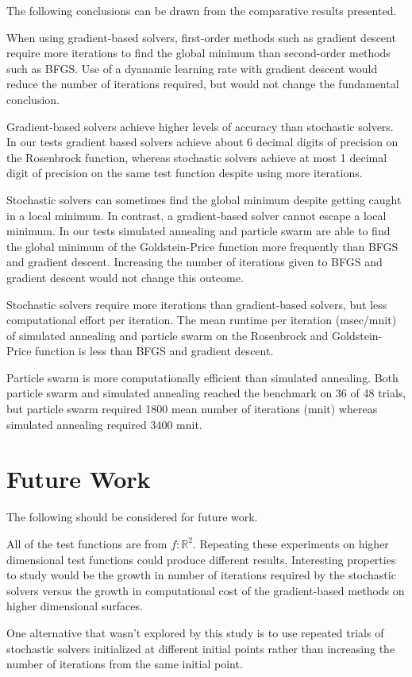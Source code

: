 \documentclass{vgtc}                          %
\begin{document}
The following conclusions can be drawn from the comparative results presented.

When using gradient-based solvers, first-order methods such as gradient descent require more iterations to find the global minimum than second-order methods such as BFGS. Use of a dyanamic learning rate with gradient descent would reduce the number of iterations required, but would not change the fundamental conclusion.

Gradient-based solvers achieve higher levels of accuracy than stochastic solvers. In our tests gradient based solvers achieve about 6 decimal digits of precision on the Rosenbrock function, whereas stochastic solvers achieve at most 1 decimal digit of precision on the same test function despite using more iterations.

Stochastic solvers can sometimes find the global minimum despite getting caught in a local minimum. In contrast, a gradient-based solver cannot escape a local minimum.  In our tests simulated annealing and particle swarm are able to find the global minimum of the Goldstein-Price function more frequently than BFGS and gradient descent. Increasing the number of iterations given to BFGS and gradient descent would not change this outcome.

Stochastic solvers require more iterations than gradient-based solvers, but less computational effort per iteration. The mean runtime per iteration (msec/mnit) of simulated annealing and particle swarm on the Rosenbrock and Goldstein-Price function is less than BFGS and gradient descent.

Particle swarm is more computationally efficient than simulated annealing. Both particle swarm and simulated annealing reached the benchmark on 36 of 48 trials, but particle swarm required 1800 mean number of iterations (mnit) whereas simulated annealing required 3400 mnit.

\section{Future Work}

The following should be considered for future work.

All of the test functions are from $f: \mathbb{R}^2$. Repeating these experiments on higher dimensional test functions could produce different results. Interesting properties to study would be the growth in number of iterations required by the stochastic solvers versus the growth in computational cost of the gradient-based methods on higher dimensional surfaces.

One alternative that wasn't explored by this study is to use repeated trials of stochastic solvers initialized at different initial points rather than increasing the number of iterations from the same initial point.




\end{document}
